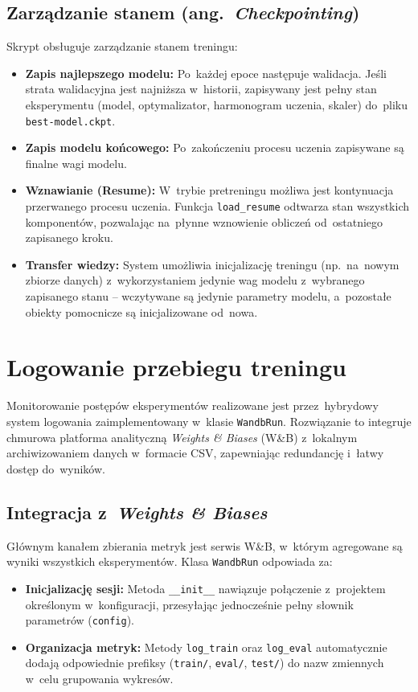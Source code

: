 \documentclass[a4paper,11pt,twoside]{report}
\theoremstyle{definition}
\begin{document}
\subsection{Zarządzanie stanem (ang.\ \emph{Checkpointing})} \label{sec:checkpointing1}
Skrypt obsługuje zarządzanie stanem treningu:
\begin{itemize}
    \item \textbf{Zapis najlepszego modelu:} Po~każdej epoce następuje walidacja. Jeśli strata walidacyjna jest najniższa w~historii, zapisywany jest pełny stan eksperymentu (model, optymalizator, harmonogram uczenia, skaler) do~pliku \texttt{best-model.ckpt}.
    \item \textbf{Zapis modelu końcowego:} Po~zakończeniu procesu uczenia zapisywane są finalne wagi modelu.
    \item \textbf{Wznawianie (Resume):} W~trybie pretreningu możliwa jest kontynuacja przerwanego procesu uczenia. Funkcja \texttt{load\_resume} odtwarza stan wszystkich komponentów, pozwalając na~płynne wznowienie obliczeń od~ostatniego zapisanego kroku.
    \item \textbf{Transfer wiedzy:} System umożliwia inicjalizację treningu (np.\ na~nowym zbiorze danych) z~wykorzystaniem jedynie wag modelu z~wybranego zapisanego stanu -- wczytywane są jedynie parametry modelu, a~pozostałe obiekty pomocnicze są inicjalizowane od~nowa.
\end{itemize}



\section{Logowanie przebiegu treningu}\label{sec:logger}

Monitorowanie postępów eksperymentów realizowane jest przez~hybrydowy system logowania zaimplementowany w~klasie \texttt{WandbRun}. Rozwiązanie to integruje chmurowa platforma analityczną \textit{Weights \& Biases} (W\&B) z~lokalnym archiwizowaniem danych w~formacie CSV, zapewniając redundancję i~łatwy dostęp do~wyników.



\subsection{Integracja z~\textit{Weights \& Biases}}
Głównym kanałem zbierania metryk jest serwis W\&B, w~którym agregowane są wyniki wszystkich eksperymentów.
Klasa \texttt{WandbRun} odpowiada za:
\begin{itemize}
    \item \textbf{Inicjalizację sesji:} Metoda \texttt{\_\_init\_\_} nawiązuje połączenie z~projektem określonym w~konfiguracji, przesyłając jednocześnie pełny słownik parametrów (\texttt{config}).
    \item \textbf{Organizacja metryk:} Metody \texttt{log\_train} oraz \texttt{log\_eval} automatycznie dodają odpowiednie prefiksy (\texttt{train/}, \texttt{eval/}, \texttt{test/}) do nazw zmiennych w~celu grupowania wykresów.
\end{itemize}
\end{document}
